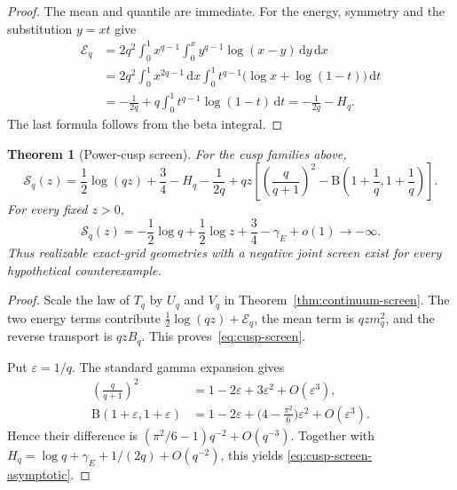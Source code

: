 \documentclass[11pt]{article}
\newcommand{\dd}{\,\mathrm d}
\newcommand{\1}{\mathbf 1}
\theoremstyle{plain}
\newtheorem{theorem}{Theorem}[section]
\theoremstyle{definition}
\theoremstyle{remark}
\begin{document}
\begin{proof}
The mean and quantile are immediate.  For the energy, symmetry and the
substitution $y=xt$ give
\begin{align*}
 \mathcal E_q
 &=2q^2\int_0^1x^{q-1}\int_0^xy^{q-1}\log(x-y)\dd y\dd x\\
 &=2q^2\int_0^1x^{2q-1}\dd x
   \int_0^1t^{q-1}\bigl(\log x+\log(1-t)\bigr)\dd t\\
 &=-\frac1{2q}+q\int_0^1t^{q-1}\log(1-t)\dd t
 =-\frac1{2q}-H_q.
\end{align*}
The last formula follows from the beta integral.
\end{proof}

\begin{theorem}[Power-cusp screen]\label{thm:cusp-screen}
For the cusp families above,
\begin{equation}\label{eq:cusp-screen}
 \boxed{
 \mathscr S_q(z)=
 \frac12\log(qz)+\frac34-H_q-\frac1{2q}
 +qz\left[
 \left(\frac q{q+1}\right)^2
 -\mathrm B\!\left(1+\frac1q,1+\frac1q\right)
 \right].}
\end{equation}
For every fixed $z>0$,
\begin{equation}\label{eq:cusp-screen-asymptotic}
 \mathscr S_q(z)
 =-\frac12\log q+\frac12\log z+\frac34-\gamma_{\!E}+o(1)
 \longrightarrow-\infty.
\end{equation}
Thus realizable exact-grid geometries with a negative joint screen exist for
every hypothetical counterexample.
\end{theorem}

\begin{proof}
Scale the law of $T_q$ by $U_q$ and $V_q$ in
Theorem~\ref{thm:continuum-screen}.  The two energy terms contribute
$\frac12\log(qz)+\mathcal E_q$, the mean term is $qz m_q^2$, and the reverse
transport is $qzB_q$.  This proves~\eqref{eq:cusp-screen}.

Put $\varepsilon=1/q$.  The standard gamma expansion gives
\begin{align*}
 \left(\frac q{q+1}\right)^2
 &=1-2\varepsilon+3\varepsilon^2+O(\varepsilon^3),\\
 \mathrm B(1+\varepsilon,1+\varepsilon)
 &=1-2\varepsilon+\bigl(4-\tfrac{\pi^2}{6}\bigr)\varepsilon^2
   +O(\varepsilon^3).
\end{align*}
Hence their difference is
$(\pi^2/6-1)q^{-2}+O(q^{-3})$.  Together with
$H_q=\log q+\gamma_{\!E}+1/(2q)+O(q^{-2})$, this yields
\eqref{eq:cusp-screen-asymptotic}.
\end{proof}
\end{document}
